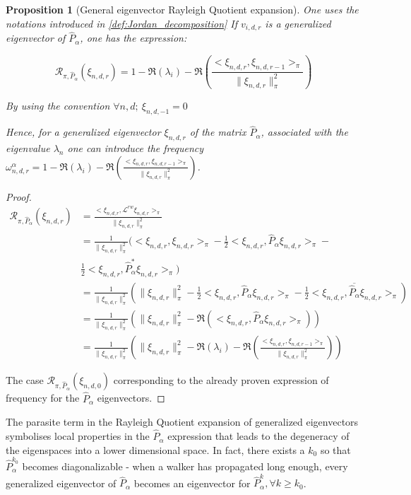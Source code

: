 \documentclass[sn-mathphys]{sn-jnl}%
\theoremstyle{thmstyleone}%
\newtheorem{prop}[theo]{Proposition}
\theoremstyle{thmstyletwo}%
\theoremstyle{thmstylethree}%
\begin{document}
\begin{prop}[General eigenvector Rayleigh Quotient expansion]
  One uses the notations introduced in \ref{def:Jordan_decomposition}
  If $v_{i,d,r}$ is a generalized eigenvector of $\hat{P}_\alpha$, one
  has the expression:

\begin{equation}
    \mathcal{R}_{\pi, \hat{P}_\alpha}(\xi_{n,d,r}) = 1 - \Re(\lambda_i) - \Re(\frac{<\xi_{n,d,r}, \xi_{n,d,r-1}>_\pi}{\|\xi_{n,d,r}\|^2_\pi})
\end{equation}

By using the convention $\forall n, d ; \ \xi_{n,d, -1} = 0$

Hence, for a generalized eigenvector $\xi_{n,d,r}$ of the matrix
$\hat{P}_\alpha$, associated with the eigenvalue $\lambda_n$ one can
introduce the frequency
$\omega_{n,d,r}^\alpha = 1 - \Re(\lambda_i) - \Re(\frac{<\xi_{n,d,r},
  \xi_{n,d,r-1}>_\pi}{\|\xi_{n,d,r}\|^2_\pi})$.

\end{prop}

\begin{proof}
\begin{align*}
    \mathcal{R}_{\pi, \hat{P}_\alpha}(\xi_{n,d,r}) &= \frac{<\xi_{n,d,r}, \mathcal{L}^{rw} \xi_{n,d,r}>_\pi}{\|\xi_{n,d,r}\|^2_\pi} \\
    &=  \frac{1}{\|\xi_{n,d,r}\|_\pi^2}(<\xi_{n,d,r}, \xi_{n,d,r}>_\pi -  \frac{1}{2} < \xi_{n,d,r}, \hat{P}_\alpha \xi_{n,d,r}>_\pi - \\ &\frac{1}{2}<\xi_{n,d,r}, \hat{P}_\alpha^* \xi_{n,d,r}>_\pi) \\
    &= \frac{1}{\|\xi_{n,d,r}\|_\pi^2} (\| \xi_{n,d,r}\|^2_\pi - \frac{1}{2} < \xi_{n,d,r}, \hat{P}_\alpha \xi_{n,d,r}>_\pi - \frac{1}{2} \overline{<\xi_{n,d,r}, \hat{P}_\alpha \xi_{n,d,r}>_\pi}) \\
    &= \frac{1}{\|\xi_{n,d,r}\|_\pi^2} (\| \xi_{n,d,r}\|^2_\pi - \Re(< \xi_{n,d,r}, \hat{P}_\alpha \xi_{n,d,r}>_\pi)) \\
    &= \frac{1}{\|\xi_{n,d,r}\|_\pi^2} (\| \xi_{n,d,r}\|^2_\pi - \Re(\lambda_i) - \Re(\frac{<\xi_{n,d,r}, \xi_{n,d,r-1}>_\pi}{\|\xi_{n,d,r}\|^2_\pi}))
\end{align*}

The case $\mathcal{R}_{\pi, \hat{P}_\alpha}(\xi_{n,d,0})$
corresponding to the already proven \cite{sevi2019} expression of
frequency for the $\hat{P}_\alpha$ eigenvectors.
\end{proof}
The parasite term in the Rayleigh Quotient expansion of generalized
eigenvectors symbolises local properties in the $\hat{P}_\alpha$
expression that leads to the degeneracy of the eigenspaces into a
lower dimensional space. In fact, there exists a $k_0$ so that
$\hat{P}^{k_0}_\alpha$ becomes diagonalizable - when a walker has
propagated long enough, every generalized eigenvector of
$\hat{P}_\alpha$ becomes an eigenvector for
$\hat{P}^k_\alpha, \forall k \geq k_0$.
\end{document}
